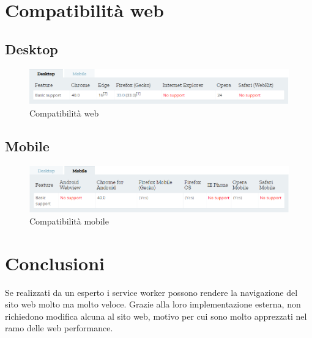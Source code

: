 \documentclass[italian]{article}
\begin{document}
\section{Compatibilità web}
\subsection{Desktop}
\begin{figure}[h]
	\centering
	\includegraphics[width=1\linewidth]{CompWeb}
	\caption{Compatibilità web}
	\label{fig:Compatibilità web}
\end{figure}
\subsection{Mobile}
\begin{figure}[h]
	\centering
	\includegraphics[width=1\linewidth]{CompMobile}
	\caption{Compatibilità mobile}
	\label{fig:Compatibilità mobile}
\end{figure}

\section{Conclusioni}
Se realizzati da un esperto i service worker possono rendere la navigazione del sito web molto ma molto veloce. Grazie alla loro implementazione esterna, non richiedono modifica alcuna al sito web, motivo per cui sono molto apprezzati nel ramo delle web performance.
\end{document}

